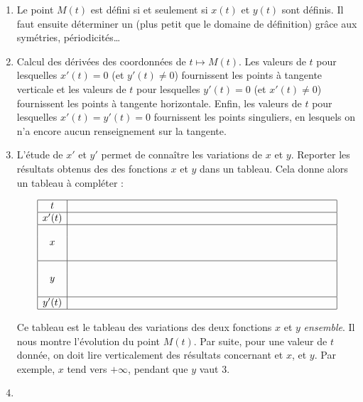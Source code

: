 \documentclass[class=report,crop=false]{standalone}
\begin{document}
\begin{enumerate}
\item {}

Le point $M(t)$ est défini si et seulement si $x(t)$ et $y(t)$ sont définis.
Il faut ensuite déterminer un  (plus petit que le domaine de définition)
grâce aux symétries, périodicités\ldots

\item {}

Calcul des dérivées des coordonnées de $t\mapsto M(t)$.
Les valeurs de $t$ pour lesquelles $x'(t)=0$ (et $y'(t)\neq0$)
fournissent les points à tangente verticale et les valeurs de
$t$ pour lesquelles $y'(t)=0$ (et $x'(t)\neq0$) fournissent les
points à tangente horizontale. Enfin, les valeurs de $t$ pour
lesquelles $x'(t)=y'(t)=0$ fournissent les points singuliers,
en lesquels on n'a encore aucun renseignement sur la tangente.


\item {}

L'étude de $x'$ et $y'$ permet de connaître les variations de $x$ et $y$.
Reporter les résultats obtenus des  des fonctions $x$ et $y$
dans un tableau. Cela donne alors un tableau à compléter :

$$\begin{array}{|c|ccccc|}
\hline
t&\qquad&\qquad&\qquad&\qquad&\qquad\\
\hline
x'(t)& & & & &\rule{5cm}{0cm}\\
\hline
 & & & & & \\
x& & & & & \\
 & & & & & \\
\hline
 & & & & & \\
y& & & & & \\
 & & & & & \\
\hline
y'(t)& & & & & \\
\hline
\end{array}
$$

Ce tableau est le tableau des variations des
deux fonctions $x$ et $y$ \emph{ensemble}. Il nous montre
l'évolution du point $M(t)$.
Par suite, pour une valeur de $t$ donnée, on doit lire
verticalement des résultats concernant et $x$, et $y$. Par
exemple, $x$ tend vers $+\infty$, pendant que $y$ \og vaut \fg{} $3$.


\item {}


\end{enumerate}
\end{document}
